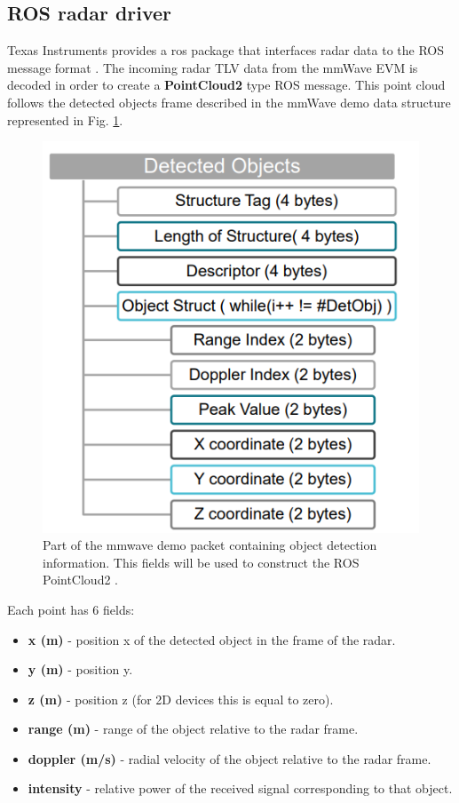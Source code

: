 \subsection{ROS radar driver}
Texas Instruments provides a ros package that interfaces radar data to the ROS message format \cite{tisetup}. The incoming radar TLV data from the mmWave EVM is decoded in order to create a  \textbf{PointCloud2} type ROS message.
This point cloud follows the detected objects frame described in the mmWave demo data structure \cite{mmdata} represented in Fig. \ref{fig:demodata}.
\begin{figure}[!htb]
    \centering
    \includegraphics[scale=0.8]{imgs/chapter4/demodata.png}
    \caption[Part of the mmwave demo packet]{Part of the mmwave demo packet containing object detection information. This fields will be used to construct the ROS PointCloud2 \cite{mmdata}.}
    \label{fig:demodata}
\end{figure}
Each point has 6 fields:
\begin{itemize}
\item \textbf{x (m)} - position x of the detected  object in the frame of the radar.
\item \textbf{y (m)} - position y.
\item \textbf{z (m)} - position z (for 2D devices this is equal to zero).
\item \textbf{range (m)} - range of the object relative to the radar frame.
\item \textbf{doppler (m/s)} - radial velocity of the object relative to the radar frame.
\item \textbf{intensity} - relative power of the received signal corresponding to that object.
\end{itemize}
